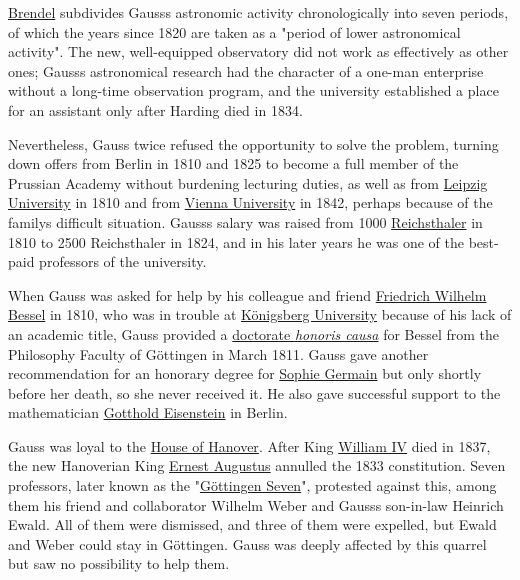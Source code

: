\href{https://en.wikipedia.org/wiki/Martin_Brendel}{Brendel} subdivides Gauss\textquotesingle s astronomic activity chronologically into seven periods, of which the years since 1820 are taken as a "period of lower astronomical activity". The new, well-equipped observatory did not work as effectively as other ones; Gauss\textquotesingle s astronomical research had the character of a one-man enterprise without a long-time observation program, and the university established a place for an assistant only after Harding died in 1834.

Nevertheless, Gauss twice refused the opportunity to solve the problem, turning down offers from Berlin in 1810 and 1825 to become a full member of the Prussian Academy without burdening lecturing duties, as well as from \href{https://en.wikipedia.org/wiki/Leipzig_University}{Leipzig University} in 1810 and from \href{https://en.wikipedia.org/wiki/Vienna_University}{Vienna University} in 1842, perhaps because of the family\textquotesingle s difficult situation. Gauss\textquotesingle s salary was raised from 1000 \href{https://en.wikipedia.org/wiki/Reichsthaler}{Reichsthaler} in 1810 to 2500 Reichsthaler in 1824, and in his later years he was one of the best-paid professors of the university.

When Gauss was asked for help by his colleague and friend \href{https://en.wikipedia.org/wiki/Friedrich_Wilhelm_Bessel}{Friedrich Wilhelm Bessel} in 1810, who was in trouble at \href{https://en.wikipedia.org/wiki/Königsberg_University}{Königsberg University} because of his lack of an academic title, Gauss provided a \href{https://en.wikipedia.org/wiki/Honorary_degree}{doctorate \emph{honoris causa}} for Bessel from the Philosophy Faculty of Göttingen in March 1811. Gauss gave another recommendation for an honorary degree for \href{https://en.wikipedia.org/wiki/Sophie_Germain}{Sophie Germain} but only shortly before her death, so she never received it. He also gave successful support to the mathematician \href{https://en.wikipedia.org/wiki/Gotthold_Eisenstein}{Gotthold Eisenstein} in Berlin.

Gauss was loyal to the \href{https://en.wikipedia.org/wiki/House_of_Hanover}{House of Hanover}. After King \href{https://en.wikipedia.org/wiki/William_IV}{William IV} died in 1837, the new Hanoverian King \href{https://en.wikipedia.org/wiki/Ernest_Augustus,_King_of_Hanover}{Ernest Augustus} annulled the 1833 constitution. Seven professors, later known as the "\href{https://en.wikipedia.org/wiki/Göttingen_Seven}{Göttingen Seven}", protested against this, among them his friend and collaborator Wilhelm Weber and Gauss\textquotesingle s son-in-law Heinrich Ewald. All of them were dismissed, and three of them were expelled, but Ewald and Weber could stay in Göttingen. Gauss was deeply affected by this quarrel but saw no possibility to help them.

